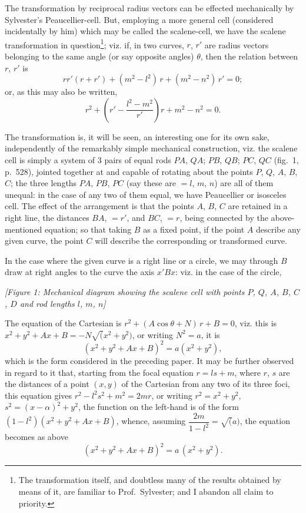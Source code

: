 \documentclass[11pt,a4paper]{article}
\theoremstyle{plain}
\theoremstyle{definition}
\theoremstyle{remark}
\begin{document}
The transformation by reciprocal radius vectors can be effected mechanically by Sylvester's Peaucellier-cell. But, employing a more general cell (considered incidentally by him) which may be called the scalene-cell, we have the scalene transformation in question\footnote{The transformation itself, and doubtless many of the results obtained by means of it, are familiar to Prof.~Sylvester; and I abandon all claim to priority.}; viz. if, in two curves, $r$, $r'$ are radius vectors belonging to the same angle (or say opposite angles) $\theta$, then the relation between $r$, $r'$ is
\[
rr'(r+r') + (m^2-l^2)\,r + (m^2-n^2)\,r' = 0;
\]
or, as this may also be written,
\[
r^2 + \left(r' - \frac{l^2-m^2}{r'}\right)r + m^2 - n^2 = 0.
\]

The transformation is, it will be seen, an interesting one for its own sake, independently of the remarkably simple mechanical construction, viz. the scalene cell is simply a system of 3 pairs of equal rods $PA$, $QA$; $PB$, $QB$; $PC$, $QC$ (fig.~1, p.~528), jointed together at and capable of rotating about the points $P$, $Q$, $A$, $B$, $C$; the three lengths $PA$, $PB$, $PC$ (say these are $= l$, $m$, $n$) are all of them unequal: in the case of any two of them equal, we have Peaucellier or isosceles cell. The effect of the arrangement is that the points $A$, $B$, $C$ are retained in a right line, the distances $BA$, $= r'$, and $BC$, $= r$, being connected by the above-mentioned equation; so that taking $B$ as a fixed point, if the point $A$ describe any given curve, the point $C$ will describe the corresponding or transformed curve.

In the case where the given curve is a right line or a circle, we may through $B$ draw at right angles to the curve the axis $x'Bx$: viz. in the case of the circle,

\begin{center}
\textit{[Figure 1: Mechanical diagram showing the scalene cell with points $P$, $Q$, $A$, $B$, $C$, $D$ and rod lengths $l$, $m$, $n$]}
\end{center}

The equation of the Cartesian is $r^2 + (A\cos\theta + N)\,r + B = 0$, viz. this is $x^2 + y^2 + Ax + B = -N\surd(x^2+y^2)$, or writing $N^2 = a$, it is
\[
(x^2 + y^2 + Ax + B)^2 = a(x^2 + y^2),
\]
which is the form considered in the preceding paper. It may be further observed in regard to it that, starting from the focal equation $r = ls + m$, where $r$, $s$ are the distances of a point $(x, y)$ of the Cartesian from any two of its three foci, this equation gives $r^2 - l^2s^2 + m^2 = 2mr$, or writing $r^2 = x^2 + y^2$, $s^2 = (x-\alpha)^2 + y^2$, the function on the left-hand is of the form $(1-l^2)(x^2 + y^2 + Ax + B)$, whence, assuming $\dfrac{2m}{1-l^2} = \surd(a)$, the equation becomes as above
\[
(x^2 + y^2 + Ax + B)^2 = a\,(x^2 + y^2).
\]
\end{document}
